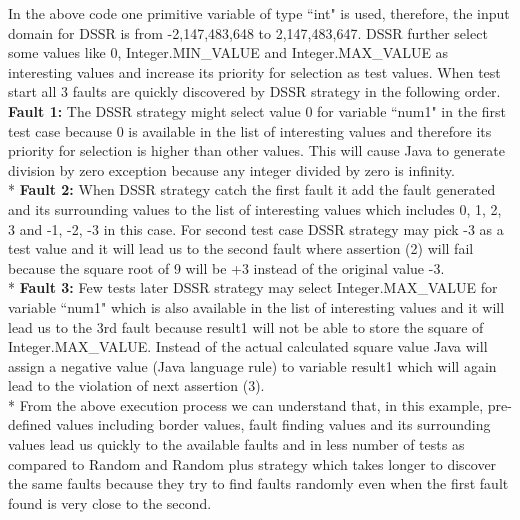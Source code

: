 \documentclass[conference]{IEEEtran}
\begin{document}
\endgroup
In the above code one primitive variable of type ``int" is used, therefore, the input domain for DSSR is from -2,147,483,648 to 2,147,483,647. DSSR further select some values like 0, Integer.MIN\_VALUE and Integer.MAX\_VALUE as interesting values and increase its priority for selection as test values. 
When test start all 3 faults are quickly discovered by DSSR strategy in the following order.\\
\indent \textbf{Fault 1:} The DSSR strategy might select value 0 for variable ``num1"  in the first test case because 0 is available in the list of interesting values and therefore its priority for selection is higher than other values. This will cause Java to generate division by zero exception because any integer divided by zero is infinity.\\*
\indent \textbf{Fault 2:} When DSSR strategy catch the first fault it add the fault generated and its surrounding values to the list of interesting values which includes 0, 1, 2, 3 and -1, -2, -3 in this case. For second test case DSSR strategy may pick -3 as a test value and it will lead us to the second fault where assertion (2) will fail because the square root of 9 will be +3 instead of the original value -3.\\*
\indent \textbf{Fault 3:} Few tests later DSSR strategy may select Integer.MAX\_VALUE for variable ``num1" which is also available in the list of interesting values and it will lead us to the 3rd fault because result1 will not be able to store the square of Integer.MAX\_VALUE. Instead of the actual calculated square value Java will assign a negative value (Java language rule) to variable result1 which will again lead to the violation of next assertion (3).\\*
\indent From the above execution process we can understand that, in this example, pre-defined values including border values, fault finding values and its surrounding values lead us quickly to the available faults and in less number of tests as compared to Random and Random plus strategy which takes longer to discover the same faults because they try to find faults randomly even when the first fault found is very close to the second.


\end{document}
